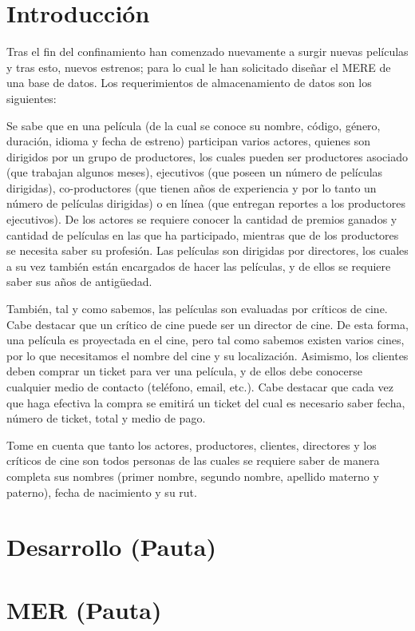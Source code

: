 \documentclass[letterpaper]{article}
\begin{document}
\section{Introducción}

Tras el fin del confinamiento han comenzado nuevamente a surgir nuevas películas y tras esto, nuevos estrenos; para lo cual le han solicitado diseñar el MERE de una base de datos. Los requerimientos de almacenamiento de datos son los siguientes:

Se sabe que en una película (de la cual se conoce su nombre, código, género, duración, idioma y fecha de estreno) participan varios actores, quienes son dirigidos por un grupo de productores, los cuales pueden ser productores asociado (que trabajan algunos meses), ejecutivos (que poseen un número de películas dirigidas), co-productores (que tienen años de experiencia y por lo tanto un número de películas dirigidas) o en línea (que entregan reportes a los productores ejecutivos). De los actores se requiere conocer la cantidad de premios ganados y cantidad de películas en las que ha participado, mientras que de los productores se necesita saber su profesión. Las películas son dirigidas por directores, los cuales a su vez también están encargados de hacer las películas, y de ellos se requiere saber sus años de antigüedad. 

También, tal y como sabemos, las películas son evaluadas por críticos de cine. Cabe destacar que un crítico de cine puede ser un director de cine. De esta forma, una película es proyectada en el cine, pero tal como sabemos existen varios cines, por lo que necesitamos el nombre del cine y su localización. Asimismo, los clientes deben comprar un ticket para ver una película, y de ellos debe conocerse cualquier medio de contacto (teléfono, email, etc.). Cabe destacar que cada vez que haga efectiva la compra se emitirá un ticket del cual es necesario saber fecha, número de ticket, total y medio de pago.

Tome en cuenta que tanto los actores, productores, clientes, directores y los críticos de cine son todos personas de las cuales se requiere saber de manera completa sus nombres (primer nombre, segundo nombre, apellido materno y paterno), fecha de nacimiento y su rut.

\section{Desarrollo (Pauta)}

\section{MER (Pauta)}
\end{document}
